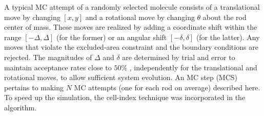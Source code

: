 A typical MC attempt of a randomly selected molecule consists of a translational move by changing $[x, y]$ and a rotational move by changing $\theta$ about the rod center of mass. These moves are
realized by adding a coordinate shift within the range $[-\Delta, \Delta]$ (for the former) or an angular shift $[-\delta, \delta]$ (for the latter). Any moves that violate the excluded-area constraint and the boundary conditions are rejected. The magnitudes of $\Delta$ and $\delta$ are determined by trial and error to maintain acceptance rates close to $50\%$ \cite{Landau}, independently for the translational and rotational moves, to allow sufficient system evolution. An MC step (MCS) pertains to making $N$ MC attempts (one for each rod on average) described here. To speed up the simulation, the cell-index technique \cite{allen} was incorporated in the algorithm.


